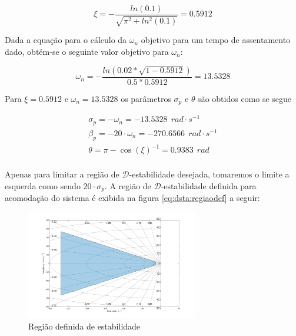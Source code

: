 \begin{equation*}
    \xi=-\frac{ln\left(0.1\right)}{\sqrt{\pi^2+ln^2(0.1)}}=0.5912
\end{equation*}

Dada a equação para o cálculo da $\omega_n$ objetivo para um tempo de assentamento dado, obtém-se o seguinte valor objetivo para $\omega_n$:

\begin{equation*}
    \omega_n=-\frac{ln\left( 0.02*\sqrt{1-0.5912} \right)}{0.5*0.5912}=13.5328
\end{equation*}

Para $\xi=0.5912$ e $\omega_n=13.5328$ os parâmetros $\sigma_p$ e $\theta$ são obtidos como se segue

\begin{equation}\label{ed:dstab:params}
    \begin{split}
       \sigma_p=-\omega_n=-13.5328\ \ rad\cdot s^{-1}\\
       \beta_p=-20\cdot\omega_n=-270.6566\ \ rad\cdot s^{-1}\\
       \theta=\pi-\cos{(\xi)}^{-1}=0.9383\ \ rad\\    
    \end{split}
\end{equation}

Apenas para limitar a região de \( \mathcal{D}\)-estabilidade desejada, tomaremos o limite a esquerda como sendo $20\cdot\sigma_p$. A região de \( \mathcal{D}\)-estabilidade definida para acomodação do sistema é exibida na figura \eqref{eq:dsta:regiaodef} a seguir:

\FloatBarrier
\begin{figure}[htbp] 
  \begin{centering}
    \includegraphics[width=7.5cm]{img/regiao_d_estabilidade.png}
    \caption{Região definida de estabilidade}
    \label{eq:dsta:regiaodef}
  \end{centering}
\end{figure}
\FloatBarrier

